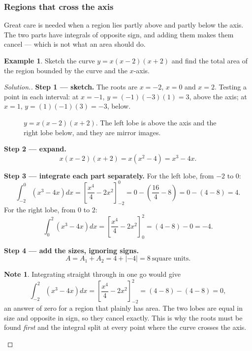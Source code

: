 \documentclass[11pt,a4paper]{article}
\theoremstyle{definition}
\newtheorem{example}[thm]{Example}
\newtheorem{note}[thm]{Note}
\newenvironment{solution}
  {\renewcommand{\qedsymbol}{}\begin{proof}[\textit{Solution}.]}
  {\end{proof}}
\begin{document}
\subsubsection{Regions that cross the axis}

Great care is needed when a region lies partly above and partly below the axis. The two
parts have integrals of opposite sign, and adding them makes them cancel --- which is
not what an area should do.

\begin{example}
Sketch the curve $y=x(x-2)(x+2)$ and find the total area of the region bounded by the
curve and the $x$-axis.
\end{example}

\begin{solution}
\textbf{Step 1 --- sketch.} The roots are $x=-2$, $x=0$ and $x=2$. Testing a point in
each interval: at $x=-1$, $y=(-1)(-3)(1)=3$, above the axis; at $x=1$,
$y=(1)(-1)(3)=-3$, below.

\begin{figure}[H]
\centering
{}
\caption{$y=x(x-2)(x+2)$. The left lobe is above the axis and the right lobe below, and they are mirror images.}
\end{figure}

\textbf{Step 2 --- expand.}
$$x(x-2)(x+2)=x\left(x^2-4\right)=x^3-4x.$$

\textbf{Step 3 --- integrate each part separately.} For the left lobe, from $-2$ to $0$:
$$\int_{-2}^{0}\left(x^3-4x\right)dx=\left[\frac{x^4}{4}-2x^2\right]_{-2}^{0}
=0-\left(\frac{16}{4}-8\right)=0-(4-8)=4.$$
For the right lobe, from $0$ to $2$:
$$\int_{0}^{2}\left(x^3-4x\right)dx=\left[\frac{x^4}{4}-2x^2\right]_{0}^{2}
=(4-8)-0=-4.$$

\textbf{Step 4 --- add the sizes, ignoring signs.}
$$A=A_1+A_2=4+|-4|=8\ \text{square units}.$$

\begin{note}
Integrating straight through in one go would give
$$\int_{-2}^{2}\left(x^3-4x\right)dx=\left[\frac{x^4}{4}-2x^2\right]_{-2}^{2}
=(4-8)-(4-8)=0,$$
an answer of zero for a region that plainly has area. The two lobes are equal in size
and opposite in sign, so they cancel exactly. This is why the roots must be found
\emph{first} and the integral split at every point where the curve crosses the axis.
\end{note}
\end{solution}
\end{document}
